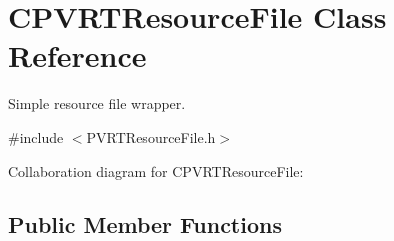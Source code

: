 \hypertarget{class_c_p_v_r_t_resource_file}{\section{C\+P\+V\+R\+T\+Resource\+File Class Reference}
\label{class_c_p_v_r_t_resource_file}
}


Simple resource file wrapper.  




{\ttfamily \#include $<$P\+V\+R\+T\+Resource\+File.\+h$>$}



Collaboration diagram for C\+P\+V\+R\+T\+Resource\+File\+:
\subsection*{Public Member Functions}
